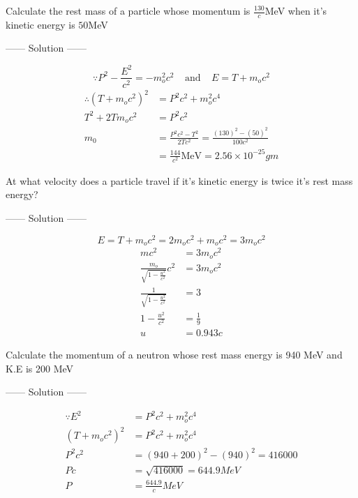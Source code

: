 \begin{example}
Calculate the rest mass of a particle whose momentum is $\frac{130}{c}$MeV when it's kinetic energy is $50$MeV
\begin{center}
    ------ \textcolor{Solution}{Solution} ------
\end{center}
\[
    \because P^2 - \frac{E^2}{c^2} = -m_o^2 c^2 \ \ \ \ \ \text{and} \ \ \ \ \ E = T + m_o c^2
\]
\begin{align*}
\therefore {(T + m_o c^2)}^2 &= P^2c^2 + m_o^2 c^4 \\
            T^2 + 2T m_o c^2 &= P^2c^2\\
            m_0 &= \frac{P^2c^2 - T^2}{2T c^2} = \frac{{(130)}^2 - {(50)}^2}{100 c^2}\\
                &= \frac{144}{c^2} \text{MeV} = 2.56 \times 10^{-25}\si{gm}
\end{align*}
\end{example}
\begin{example}
At what velocity does a particle travel if it's kinetic energy is twice it's rest mass energy?
\begin{center}
    ------ \textcolor{Solution}{Solution} ------
\end{center}
\[
E = T + m_o c^2 = 2 m_o c^2 + m_o c^2  = 3 m_o c^2
\]
\begin{align*}
    m c^2 &= 3 m_o c^2\\
    \frac{m_o}{\sqrt{1 - \frac{u^2}{c^2}}}c^2 &= 3 m_o c^2\\
    \frac{1}{\sqrt{1 - \frac{u^2}{c^2}}} &= 3\\
    1 - \frac{u^2}{c^2} &= \frac{1}{9}\\
    u &= 0.943c
\end{align*}
\end{example}
\begin{example}
Calculate the momentum of a neutron whose rest mass energy is 940 MeV and K.E is 200 MeV
\begin{center}
    ------ \textcolor{Solution}{Solution} ------
\end{center}
\begin{align*}
    \because E^2 &= P^2c^2 + m_o^2 c^4 \\    
    {(T + m_o c^2)}^2 &= P^2c^2 + m_o^2 c^4 \\
    P^2c^2 &={(940 + 200)}^2 - {(940)}^2 = 416000\\
    Pc &= \sqrt{416000} = 644.9 \si{MeV}\\
    P &=\frac{644.9}{c} \si{MeV}
\end{align*}
\end{example}
